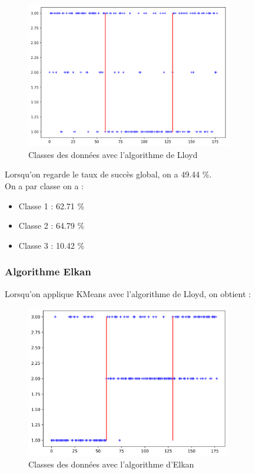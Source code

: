 \documentclass[a4paper,12pt]{article}
\begin{document}
\newpage

\begin{figure}[h!] %
   \centering
   \includegraphics[width=0.8\textwidth]{lloyd.png} %
   \caption{Classes des données avec l'algorithme de Lloyd}
   \label{fig:lloyd} %
\end{figure}

Lorsqu'on regarde le taux de succès global, on a 49.44 \%.\\

On a par classe on a :
\begin{itemize}
\item Classe 1 : 62.71 \%
\item Classe 2 : 64.79 \%
\item Classe 3 : 10.42 \%
\end{itemize}


\subsubsection{Algorithme Elkan}
Lorsqu'on applique KMeans avec l'algorithme de Lloyd, on obtient :

\newpage

\begin{figure}[h!] %
   \centering
   \includegraphics[width=0.8\textwidth]{elkan.png} %
   \caption{Classes des données avec l'algorithme d'Elkan}
   \label{fig:elkan} %
\end{figure}
\end{document}
